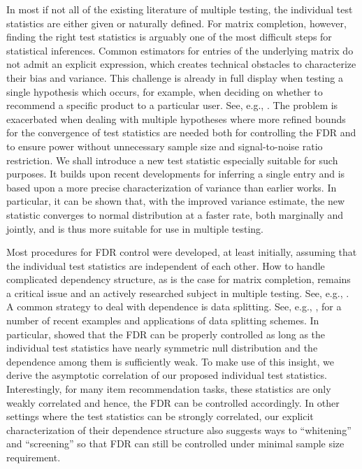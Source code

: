 \documentclass[12pt]{article}
\theoremstyle{plain}
\begin{document}
\begin{sloppypar}
In most if not all of the existing literature of multiple testing, the individual test statistics are either given or naturally defined. For matrix completion, however, finding the right test statistics is arguably one of the most difficult steps for statistical inferences. Common estimators for entries of the underlying matrix do not admit an explicit expression, which creates technical obstacles to characterize their bias and variance. This challenge is already in full display when testing a single hypothesis which occurs, for example, when deciding on whether to recommend a specific product to a particular user. See, e.g., \cite{chen2019inference, xia2021statistical,farias2022uncertainty,chen2023statistical,gui2023conformalized, shao2023distribution}. The problem is exacerbated when dealing with multiple hypotheses where more refined bounds for the convergence of test statistics are needed both for controlling the FDR and to ensure power without unnecessary sample size and signal-to-noise ratio restriction. We shall introduce a new test statistic especially suitable for such purposes. It builds upon recent developments \citep[e.g.,][]{chen2019inference,xia2021statistical} for inferring a single entry and is based upon a more precise characterization of variance than earlier works. In particular, it can be shown that, with the improved variance estimate, the new statistic converges to normal distribution at a faster rate, both marginally and jointly, and is thus more suitable for use in multiple testing.

Most procedures for FDR control were developed, at least initially, assuming that the individual test statistics are independent of each other. How to handle complicated dependency structure, as is the case for matrix completion, remains a critical issue and an actively researched subject in multiple testing. See, e.g., \cite{efron2007correlation, leek2008general, fan2017estimation, li2017rate, du2021false, fithian2022conditional}. A common strategy to deal with dependence is data splitting. See, e.g., \cite{roeder2009genome, song2015split, barber2019knockoff, zou2020new, du2021false, dai2022false, dai2023scale}, for a number of recent examples and applications of data splitting schemes. In particular, \cite{du2021false} showed that the FDR can be properly controlled as long as the individual test statistics have nearly symmetric null distribution and the dependence among them is sufficiently weak. To make use of this insight, we derive the asymptotic correlation of our proposed individual test statistics. Interestingly, for many item recommendation tasks, these statistics are only weakly correlated and hence, the FDR can be controlled accordingly. In other settings where the test statistics can be strongly correlated, our explicit characterization of their dependence structure also suggests ways to ``whitening'' and ``screening'' so that FDR can still be controlled under minimal sample size requirement.



\end{sloppypar}
\end{document}
